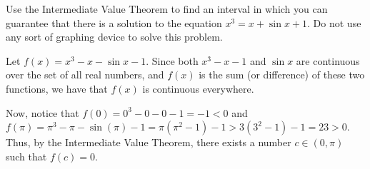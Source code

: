 \documentclass[nooutcomes]{ximera}
\begin{document}
\begin{problem}
Use the Intermediate Value Theorem to find an interval in which you can guarantee that there is a solution to the equation $x^3 = x + \sin x + 1$.  Do not use any sort of graphing device to solve this problem.
	
	\begin{freeResponse}
	
	Let $f(x) = x^3 - x - \sin x - 1$.  Since both $x^3 - x - 1$ and $\sin x$ are continuous over the set of all real numbers, and $f(x)$ is the sum (or difference) of these two functions, we have that $f(x)$ is continuous everywhere.  
	
	Now, notice that $f(0) = 0^3 - 0 - 0 - 1 = -1 < 0$ and $f(\pi) = \pi^3 - \pi - \sin(\pi) - 1 = \pi(\pi^2 - 1) - 1 > 3(3^2 - 1) - 1 = 23 > 0$.  Thus, by the Intermediate Value Theorem, there exists a number $c \in (0, \pi)$ such that $f(c) = 0$.  
	
	\end{freeResponse}
\end{problem}
	










								
				
				
	
\end{document}
